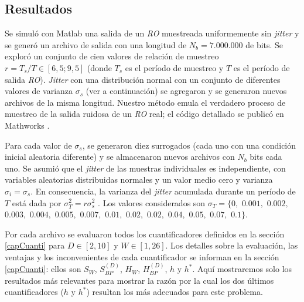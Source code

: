 \subsection{Resultados}
\label{sec:resu}

Se simuló con Matlab\textsuperscript{\textregistered} una salida de un \emph{RO} muestreada uniformemente sin \textit{jitter} y se generó un archivo de salida con una longitud de $N_b = 7.000.000$ de bits.
Se exploró un conjunto de cien valores de relación de muestreo $r = T_s/T \in [6,5; 9,5]$ (donde $T_s$ es el período de muestreo y $T$ es el período de salida \emph{RO}).
\textit{Jitter} con una distribución normal con un conjunto de diferentes valores de varianza $\sigma_s$ (ver a continuación) se agregaron y se generaron nuevos archivos de la misma longitud.
Nuestro método emula el verdadero proceso de muestreo de la salida ruidosa de un \emph{RO} real; el código detallado se publicó en Mathworks \cite{MathworksMaxi}.

Para cada valor de $\sigma_s$, se generaron diez surrogados (cada uno con una condición inicial aleatoria diferente) y se almacenaron nuevos archivos con $N_b$ bits cada uno. Se asumió que el \textit{jitter} de las muestras individuales es independiente, con variables aleatorias distribuidas normales y un valor medio cero y varianza $\sigma_i = \sigma_s$.
En consecuencia, la varianza del \textit{jitter} acumulada durante un período de $T$ está dada por $\sigma^2_T = r \sigma^2_s $ \cite{Valtchanov2008}.
Los valores considerados son $\sigma_T=\{0,$ $0.001,$ $0.002,$ $0.003,$ $0.004,$ $0.005,$ $0.007,$ $0.01,$ $0.02,$ $0.02,$ $0.04,$ $0.05,$ $0.07,$ $0.1\}$.

Por cada archivo se evaluaron todos los cuantificadores definidos en la sección \ref{capCuanti} para $D\in[2,10]$ y $W\in[1,26]$.
Los detalles sobre la evaluación, las ventajas y los inconvenientes de cada cuantificador se informan en la sección \ref{capCuanti}: ellos son $S_W$, $S^{(D)}_{BP}$, $H_{W}$, $H^{(D)}_{BP}$, $h$ y $h^*$. 
Aquí mostraremos solo los resultados más relevantes para mostrar la razón por la cual los dos últimos cuantificadores ($h$ y $h^*$) resultan los más adecuados para este problema.

